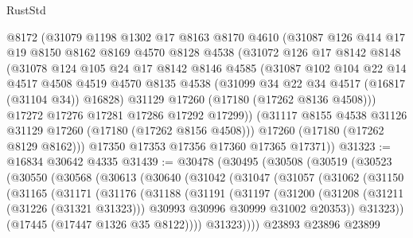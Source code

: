 \begin{lexlean}{RustStd}
\begin{coremodule}
      @8172
      (@31079
        @1198
        @1302
        @17
        @8163
        @8170
        @4610
        (@31087
          @126
          @414
          @17
          @19
          @8150
          @8162
          @8169
          @4570
          @8128
          @4538
          (@31072
            @126
            @17
            @8142
            @8148
            (@31078
              @124
              @105
              @24
              @17
              @8142
              @8146
              @4585
              (@31087
                @102
                @104
                @22
                @14
                @4517
                @4508
                @4519
                @4570
                @8135
                @4538
                (@31099 @34 @22 @34 @4517 (@16817 (@31104 @34)) @16828)
                @31129
                @17260
                (@17180 (@17262 @8136 @4508)))
              @17272
              @17276
              @17281
              @17286
              @17292
              @17299))
          (@31117 @8155 @4538 @31126 @31129 @17260 (@17180 (@17262 @8156 @4508)))
          @17260
          (@17180 (@17262 @8129 @8162)))
        @17350
        @17353
        @17356
        @17360
        @17365
        @17371))
@31323 := @16834 @30642 @4335
@31439 := @30478
    (@30495
      (@30508
        (@30519
          (@30523
            (@30550
              (@30568
                (@30613
                  (@30640
                    (@31042
                      (@31047
                        (@31057
                          (@31062
                            (@31150
                              (@31165
                                (@31171
                                  (@31176
                                    (@31188
                                      (@31191
                                        (@31197
                                          (@31200
                                            (@31208
                                              (@31211 (@31226 (@31321 @31323)))
                                              @30993
                                              @30996
                                              @30999
                                              @31002
                                              @20353))
                                          @31323))
                                      (@17445 (@17447 @1326 @35 @8122))))
                                  @31323))))
                          @23893
                          @23896
                          @23899

\end{coremodule}
\end{lexlean}
